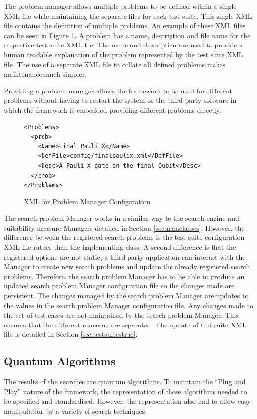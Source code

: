 The problem manager allows multiple problems to be defined within a single XML file while maintaining the separate files for each test suite.
This single XML file contains the definition of multiple problems.
An example of these XML files can be seen in Figure \ref{code:probmanconfig}.
A problem has a name, description and file name for the respective test suite XML file.
The name and description are used to provide a human readable explanation of the problem represented by the test suite XML file.
The use of a separate XML file to collate all defined problems makes maintenance much simpler.

Providing a problem manager allows the framework to be used for different problems without having to restart the system or the third party software in which the framework is embedded providing different problems directly.

\lstset{language=XML}
\begin{figure}
\begin{lstlisting}
<Problems>
  <prob>
    <Name>Final Pauli X</Name>
    <DefFile>config/finalpaulix.xml</DefFile>
    <Desc>A Pauli X gate on the final Qubit</Desc>
  </prob>
</Problems>
\end{lstlisting}
\caption{XML for Problem Manager Configuration}
\label{code:probmanconfig}
\end{figure}

The search problem Manager works in a similar way to the search engine and suitability measure Managers detailed in Section \ref{sec:manclasses}.
However, the difference between the registered search problems is the test suite configuration XML file rather than the implementing class.
A second difference is that the registered options are not static, a third party application can interact with the Manager to create new search problems and update the already registered search problems.
Therefore, the search problem Manager has to be able to produce an updated search problem Manager configuration file so the changes made are persistent.
The changes managed by the search problem Manager are updates to the values in the search problem Manager configuration file.
Any changes made to the set of test cases are not maintained by the search problem Manager.
This ensures that the different concerns are separated.
The update of test suite XML file is detailed in Section \ref{sec:testsuitestruc}.

\subsection{Quantum Algorithms}
\label{sec:quantalgs}
The results of the searches are quantum algorithms.
To maintain the ``Plug and Play'' nature of the framework, the representation of these algorithms needed to be specified and standardised.
However, the representation also had to allow easy manipulation by a variety of search techniques.

